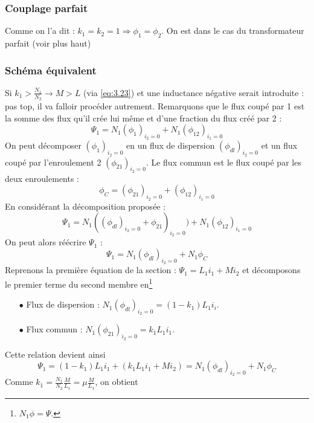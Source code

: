 		\subsubsection{Couplage parfait}
		Comme on l'a dit : $k_1=k_2=1 \Rightarrow \phi_1=\phi_2$. On est dans le cas du 
		transformateur parfait (voir plus haut)
		
		\subsubsection{Schéma équivalent}
		Si $k_1>\frac{N_1}{N_2} \rightarrow M>L$ (via \autoref{eq:3.23}) et une 
		inductance négative serait 
		introduite : pas top, il va falloir procéder autrement. Remarquons que le 
		flux coupé par 1 est la somme des flux qu'il crée lui même et d'une fraction 
		du flux créé par 2 :
		\begin{equation}
		\Psi_1 = N_1(\phi_1)_{i_2=0} + N_1(\phi_{12})_{i_1=0}
		\end{equation}
		On peut décomposer $(\phi_1)_{i_2=0}$ en un flux de dispersion $(\phi_{dl})_{i_2=0}$ 
		et un flux 	coupé par l'enroulement 2 $(\phi_{21})_{i_2=0}$. Le flux commun est 
		le flux coupé par les deux 	enroulements :
		\begin{equation}
		\phi_C = (\phi_{21})_{i_2=0} + (\phi_{12})_{i_1=0}
		\end{equation}
		En considérant la décomposition proposée :
		\begin{equation}
		\Psi_1 = N_1((\phi_{dl})_{i_2=0}+\phi_{21})_{i_2=0})+N_1(\phi_{12})_{i_1=0}
		\end{equation}
		On peut alors réécrire $\Psi_1$ :
		\begin{equation}
		\Psi_1 = N_1(\phi_{dl})_{i_2=0} + N_1\phi_C
		\end{equation}
		Reprenons la première équation de la section : $\Psi_1 = L_1i_1 + Mi_2$ et 
		décomposons le premier terme du second membre en\footnote{$N_1\phi = \Psi$.}
		\begin{itemize}
		\item[$\bullet$] Flux de dispersion : $N_1(\phi_{dl})_{i_2=0} = (1-k_1)L_1i_i$.
		\item[$\bullet$] Flux commun : $N_1(\phi_{21})_{i_2=0} = k_1L_1i_1$.
		\end{itemize}
		Cette relation devient ainsi 
		\begin{equation}
		\Psi_1 = (1-k_1)L_1i_1 + (k_1L_1i_1 + Mi_2) = N_1(\phi_{dl})_{i_2=0} + N_1\phi_C
		\end{equation}
		Comme $k_1 = \frac{N_1}{N_2}\frac{M}{L_1} = \mu\frac{M}{L_1}$, on obtient
